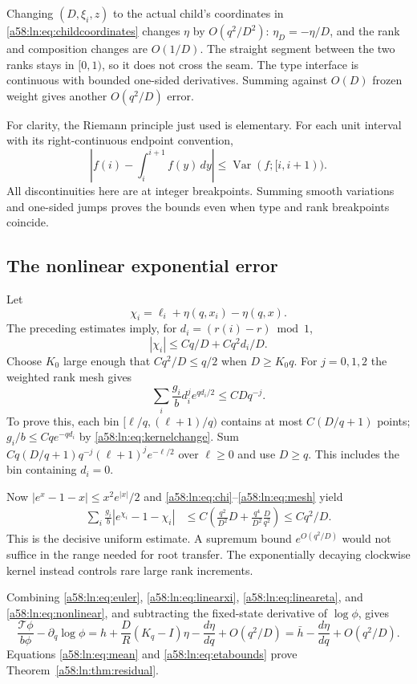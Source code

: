\documentclass[11pt,letterpaper]{article}
\theoremstyle{remark}
\newcommand{\TT}{\mathcal T}
\newcommand{\dd}{\,d}
\begin{document}
Changing $(D,\xi_i,z)$ to the actual child's coordinates in
\eqref{a58:ln:eq:childcoordinates} changes $\eta$ by $O(q^2/D^2)$:
$\eta_D=-\eta/D$, and the rank and composition changes are $O(1/D)$.
The straight segment between the two ranks stays in $[0,1)$, so it does
not cross the seam. The type interface is continuous with bounded
one-sided derivatives. Summing against $O(D)$ frozen weight gives
another $O(q^2/D)$ error.

For clarity, the Riemann principle just used is elementary. For each
unit interval with its right-continuous endpoint convention,
\[
 \left|f(i)-\int_i^{i+1}f(y)\dd y\right|
 \le\operatorname{Var}(f;[i,i+1)).
\]
All discontinuities here are at integer breakpoints. Summing smooth
variations and one-sided jumps proves the bounds even when type and
rank breakpoints coincide.

\subsection{The nonlinear exponential error}
Let
\[
 \chi_i=\ell_i+\eta(q,x_i)-\eta(q,x).
\]
The preceding estimates imply, for $d_i=(r(i)-r)\bmod1$,
\begin{equation}\label{a58:ln:eq:chi}
 |\chi_i|\le Cq/D+Cq^2d_i/D.
\end{equation}
Choose $K_0$ large enough that $Cq^2/D\le q/2$ when $D\ge K_0q$.
For $j=0,1,2$ the weighted rank mesh gives
\begin{equation}\label{a58:ln:eq:mesh}
 \sum_i\frac{g_i}b d_i^j e^{qd_i/2}\le CDq^{-j}.
\end{equation}
To prove this, each bin $[\ell/q,(\ell+1)/q)$ contains at most
$C(D/q+1)$ points; $g_i/b\le Cqe^{-qd_i}$ by
\eqref{a58:ln:eq:kernelchange}. Sum
$Cq(D/q+1)q^{-j}(\ell+1)^je^{-\ell/2}$ over $\ell\ge0$ and use
$D\ge q$. This includes the bin containing $d_i=0$.

Now $|e^x-1-x|\le x^2e^{|x|}/2$ and \eqref{a58:ln:eq:chi}--\eqref{a58:ln:eq:mesh}
yield
\begin{align}\label{a58:ln:eq:nonlinear}
 \sum_i\frac{g_i}b|e^{\chi_i}-1-\chi_i|
 &\le C\left(\frac{q^2}{D^2}D+
             \frac{q^4}{D^2}\frac D{q^2}\right)
 \le Cq^2/D.
\end{align}
This is the decisive uniform estimate. A supremum bound
$e^{O(q^2/D)}$ would not suffice in the range needed for root transfer.
The exponentially decaying clockwise kernel instead controls rare
large rank increments.

Combining \eqref{a58:ln:eq:euler}, \eqref{a58:ln:eq:linearxi}, \eqref{a58:ln:eq:lineareta},
and \eqref{a58:ln:eq:nonlinear}, and subtracting the fixed-state derivative of
$\log\phi$, gives
\[
 \frac{\TT\phi}{b\phi}-\partial_q\log\phi
 =h+\frac DR(K_q-I)\eta-\frac{d\eta}{dq}+O(q^2/D)
 =\bar h-\frac{d\eta}{dq}+O(q^2/D).
\]
Equations \eqref{a58:ln:eq:mean} and \eqref{a58:ln:eq:etabounds} prove
Theorem~\ref{a58:ln:thm:residual}.
\end{document}
